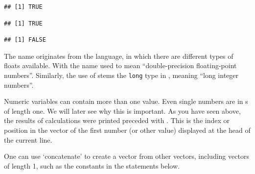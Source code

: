\documentclass[krantz2]{krantz}\usepackage{knitr}%
\begin{document}
\begin{explainbox}
\begin{knitrout}\footnotesize
{}\color{fgcolor}\begin{kframe}
\begin{alltt}
\hlstd{(}\hlstd{)}
\end{alltt}
\begin{verbatim}
## [1] TRUE
\end{verbatim}
\begin{alltt}
\hlstd{(}\hlstd{)}
\end{alltt}
\begin{verbatim}
## [1] TRUE
\end{verbatim}
\begin{alltt}
\hlstd{(}\hlstd{)}
\end{alltt}
\begin{verbatim}
## [1] FALSE
\end{verbatim}
\end{kframe}
\end{knitrout}

The name  originates from the \Clang language, in which there are different types of floats available. With the name  used to mean ``double-precision floating-point numbers''. Similarly, the use of  stems the \texttt{long} type in \Clang, meaning ``long integer numbers''.
\end{explainbox}

Numeric variables can contain more than one value. Even single numbers are in \Rlang {}s of length one. We will later see why this is important. As you have seen above, the results of calculations were printed preceded with \code{[1]}. This is the index or position in the vector of the first number (or other value) displayed at the head of the current line.

One can use  `concatenate' to create a vector from other vectors, including vectors of length 1, such as the  constants in the statements below.
\end{document}
